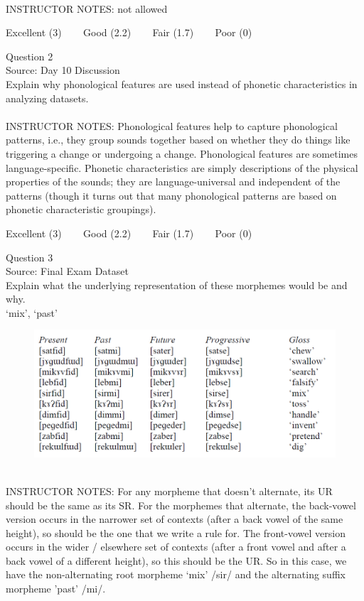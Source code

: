 \documentclass[12pt]{article}
\begin{document}
~\\
INSTRUCTOR NOTES: not allowed


\vfill
Excellent (3) ~~~ Good (2.2) ~~~ Fair (1.7) ~~~ Poor (0)
\newpage

{\large Question 2}\\

Source: Day 10 Discussion\\

Explain why phonological features are used instead of phonetic characteristics in analyzing datasets.\\


~\\
INSTRUCTOR NOTES: Phonological features help to capture phonological patterns, i.e., they group sounds together based on whether they do things like triggering a change or undergoing a change. Phonological features are sometimes language-specific. Phonetic characteristics are simply descriptions of the physical properties of the sounds; they are language-universal and independent of the patterns (though it turns out that many phonological patterns are based on phonetic characteristic groupings).


\vfill
Excellent (3) ~~~ Good (2.2) ~~~ Fair (1.7) ~~~ Poor (0)
\newpage

{\large Question 3}\\

Source: Final Exam Dataset\\

Explain what the underlying representation of these morphemes would be and why.\\

`mix', `past'

\begin{figure}[H]
\includegraphics{../images/final_dataset.png}
\end{figure}

~\\
INSTRUCTOR NOTES: For any morpheme that doesn’t alternate, its UR should be the same as its SR.  For the morphemes that alternate, the back-vowel version occurs in the narrower set of contexts (after a back vowel of the same height), so should be the one that we write a rule for. The front-vowel version occurs in the wider / elsewhere set of contexts (after a front vowel and after a back vowel of a different height), so this should be the UR. So in this case, we have the non-alternating root morpheme ‘mix’ /sir/ and the alternating suffix morpheme 'past' /mi/.
\end{document}
